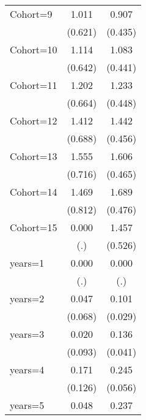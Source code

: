 \begin{table}[htbp]
\begin{tabular}{l*{2}{c}}
\addlinespace
Cohort=9            &       1.011         &       0.907\sym{**} \\
                    &     (0.621)         &     (0.435)         \\
\addlinespace
Cohort=10           &       1.114\sym{*}  &       1.083\sym{**} \\
                    &     (0.642)         &     (0.441)         \\
\addlinespace
Cohort=11           &       1.202\sym{*}  &       1.233\sym{***}\\
                    &     (0.664)         &     (0.448)         \\
\addlinespace
Cohort=12           &       1.412\sym{**} &       1.442\sym{***}\\
                    &     (0.688)         &     (0.456)         \\
\addlinespace
Cohort=13           &       1.555\sym{**} &       1.606\sym{***}\\
                    &     (0.716)         &     (0.465)         \\
\addlinespace
Cohort=14           &       1.469\sym{*}  &       1.689\sym{***}\\
                    &     (0.812)         &     (0.476)         \\
\addlinespace
Cohort=15           &       0.000         &       1.457\sym{***}\\
                    &         (.)         &     (0.526)         \\
\addlinespace
years=1             &       0.000         &       0.000         \\
                    &         (.)         &         (.)         \\
\addlinespace
years=2             &       0.047         &       0.101\sym{***}\\
                    &     (0.068)         &     (0.029)         \\
\addlinespace
years=3             &       0.020         &       0.136\sym{***}\\
                    &     (0.093)         &     (0.041)         \\
\addlinespace
years=4             &       0.171         &       0.245\sym{***}\\
                    &     (0.126)         &     (0.056)         \\
\addlinespace
years=5             &       0.048         &       0.237\sym{***}\\

\end{tabular}
\end{table}

